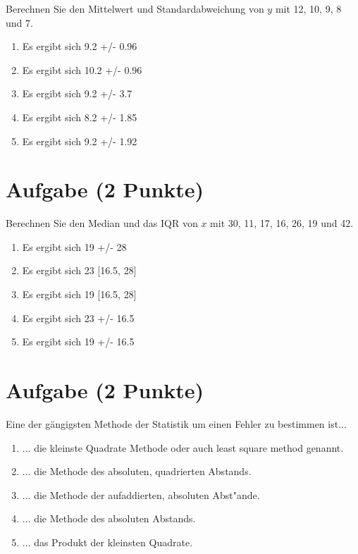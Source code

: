 \documentclass[a4paper, 10pt]{scrartcl}\usepackage[]{graphicx}\usepackage[]{xcolor}
\begin{document}
Berechnen Sie den Mittelwert und Standardabweichung von $y$ mit 12, 10, 9, 8 und 7.



\begin{enumerate}
\item [\textbf{A} \msquare] Es ergibt sich 9.2 +/- 0.96
\item [\textbf{B} \msquare] Es ergibt sich 10.2 +/- 0.96
\item [\textbf{C} \msquare] Es ergibt sich 9.2 +/- 3.7
\item [\textbf{D} \msquare] Es ergibt sich 8.2 +/- 1.85
\item [\textbf{E} \msquare] Es ergibt sich 9.2 +/- 1.92
\end{enumerate} 

\section{Aufgabe \hfill (2 Punkte)}




Berechnen Sie den Median und das IQR von $x$ mit 30, 11, 17, 16, 26, 19 und 42.



\begin{enumerate}
\item [\textbf{A} \msquare] Es ergibt sich 19 +/- 28
\item [\textbf{B} \msquare] Es ergibt sich 23 [16.5, 28]
\item [\textbf{C} \msquare] Es ergibt sich 19 [16.5, 28]
\item [\textbf{D} \msquare] Es ergibt sich 23 +/- 16.5
\item [\textbf{E} \msquare] Es ergibt sich 19 +/- 16.5
\end{enumerate}

\section{Aufgabe \hfill (2 Punkte)}

Eine der g{\"a}ngigsten Methode der Statistik um einen Fehler zu bestimmen ist...



\begin{enumerate}
\item [\textbf{A} \msquare] ... die kleinste Quadrate Methode oder auch least square method genannt.
\item [\textbf{B} \msquare] ... die Methode des absoluten, quadrierten Abstands.
\item [\textbf{C} \msquare] ... die Methode der aufaddierten, absoluten Abst{"a}nde.
\item [\textbf{D} \msquare] ... die Methode des absoluten Abstands.
\item [\textbf{E} \msquare] ... das Produkt der kleinsten Quadrate.
\end{enumerate} 
\end{document}
